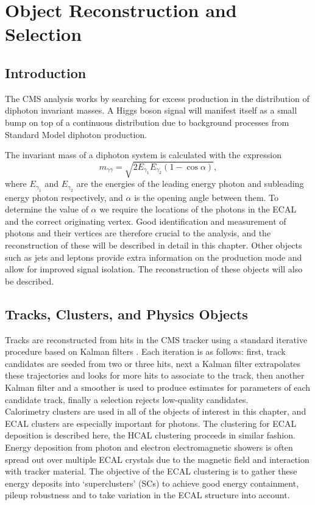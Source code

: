 \chapter{Object Reconstruction and Selection}
\label{chap:object_reco}

\section{Introduction}
The CMS \Hgg analysis works by searching for excess production in the distribution of diphoton invariant masses. A Higgs boson signal will manifest itself as a small bump on top of a continuous distribution due to background processes from Standard Model diphoton production.

The invariant mass of a diphoton system is calculated with the expression
\begin{equation}
    m_{\gamma\gamma} = \sqrt{2E_{\gamma_1}E_{\gamma_2}(1-\cos{\alpha})},
\end{equation}
where $E_{\gamma_1}$ and $E_{\gamma_2}$ are the energies of the leading energy photon and subleading energy photon respectively, and $\alpha$ is the opening angle between them. 
To determine the value of $\alpha$ we require the locations of the photons in the ECAL and the correct originating vertex. 
Good identification and measurement of photons and their vertices are therefore crucial to the analysis, and the reconstruction of these will be described in detail in this chapter. 
Other objects such as jets and leptons provide extra information on the production mode and allow for improved signal isolation. The reconstruction of these objects will also be described.

\section{Tracks, Clusters, and Physics Objects}
Tracks are reconstructed from hits in the CMS tracker using a standard iterative procedure based on Kalman filters \cite{TrackReco}. 
Each iteration is as follows: first, track candidates are seeded from two or three hits, next a Kalman filter extrapolates these trajectories and looks for more hits to associate to the track,
then another Kalman filter and a smoother is used to produce estimates for parameters of each candidate track, finally a selection rejects low-quality candidates.  
\\

Calorimetry clusters are used in all of the objects of interest in this chapter, and ECAL clusters are especially important for photons. 
The clustering for ECAL deposition is described here, the HCAL clustering proceeds in similar fashion. 
Energy deposition from photon and electron electromagnetic showers is often spread out over multiple ECAL crystals due to the magnetic field and interaction with tracker material. 
The objective of the ECAL clustering is to gather these energy deposits into `superclusters' (SCs) to achieve good energy containment, pileup robustness and to take variation in the ECAL structure into account.

